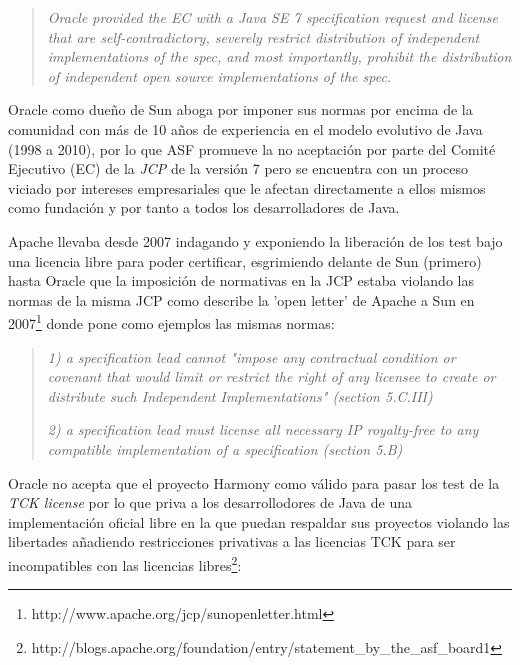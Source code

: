 \documentclass[11pt]{scrartcl}
\begin{document}
\begin{quotation}
    \emph{Oracle provided the EC with a Java SE 7 specification request and license that are self-contradictory, severely restrict distribution of independent implementations of the spec, and most importantly, prohibit the distribution of independent open source implementations of the spec.}
\end{quotation}
    
Oracle como dueño de Sun aboga por imponer sus normas por encima de la comunidad con más de 10 años de experiencia en el modelo evolutivo de Java (1998 a 2010), por lo que ASF promueve la no aceptación por parte del Comité Ejecutivo (EC) de la \emph{JCP} de la versión 7 pero se encuentra con un proceso viciado por intereses empresariales que le afectan directamente a ellos mismos como fundación y por tanto a todos los desarrolladores de Java.

Apache llevaba desde 2007 indagando y exponiendo la liberación de los test bajo una licencia libre para poder certificar, esgrimiendo delante de Sun (primero) hasta Oracle que la imposición de normativas en la JCP estaba violando las normas de la misma JCP como describe la 'open letter' de Apache a Sun en 2007\footnote{http://www.apache.org/jcp/sunopenletter.html} donde pone como ejemplos las mismas normas:

\begin{quotation}
  \emph{1) a specification lead cannot "impose any contractual condition
     or covenant that would limit or restrict the right of any
     licensee to create or distribute such Independent
     Implementations" (section 5.C.III)}

  \emph{2) a specification lead must license all necessary IP
     royalty-free to any compatible implementation of a
     specification (section 5.B)}
\end{quotation}

Oracle no acepta que el proyecto Harmony como válido para pasar los test de la \emph{TCK license} por lo que priva a los desarrollodores de Java de una implementación oficial libre en la que puedan respaldar sus proyectos violando las libertades añadiendo restricciones privativas a las licencias TCK para ser incompatibles con las licencias libres\footnote{http://blogs.apache.org/foundation/entry/statement\_by\_the\_asf\_board1}:
\end{document}
